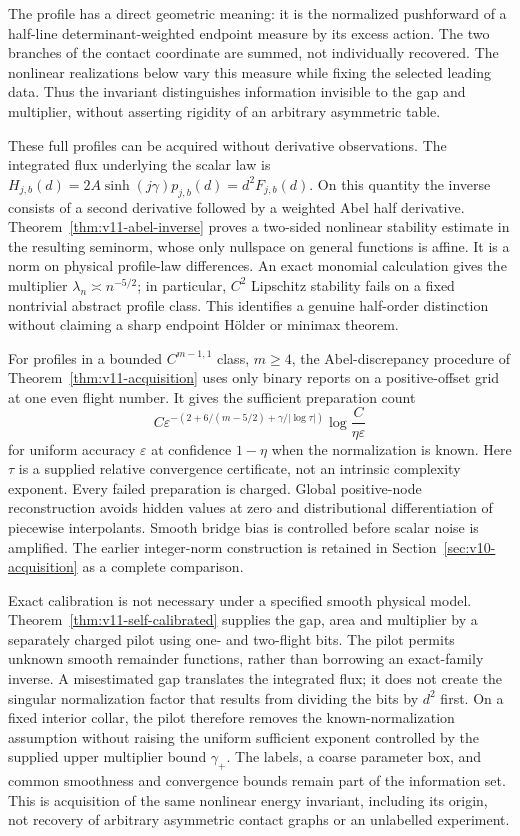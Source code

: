 The profile has a direct geometric meaning: it is the normalized
pushforward of a half-line determinant-weighted endpoint measure by
its excess action. The two branches of the contact coordinate are
summed, not individually recovered. The nonlinear realizations below
vary this measure while fixing the selected leading data. Thus the
invariant distinguishes information invisible to the gap and multiplier,
without asserting rigidity of an arbitrary asymmetric table.

These full profiles can be acquired without derivative observations.
The integrated flux underlying the scalar law is
$H_{j,b}(d)=2A\sinh(j\gamma)p_{j,b}(d)=d^2F_{j,b}(d)$.
On this quantity the inverse consists of a second derivative followed
by a weighted Abel half derivative. Theorem~\ref{thm:v11-abel-inverse}
proves a two-sided nonlinear stability estimate in the resulting
seminorm, whose only nullspace on general functions is affine.
It is a norm on physical profile-law differences. An exact monomial
calculation gives the multiplier $\lambda_n\asymp n^{-5/2}$;
in particular, $C^2$ Lipschitz stability fails on a fixed nontrivial
abstract profile class. This identifies a genuine half-order distinction
without claiming a sharp endpoint H\"older or minimax theorem.

For profiles in a bounded $C^{m-1,1}$ class, $m\ge4$, the
Abel-discrepancy procedure of Theorem~\ref{thm:v11-acquisition} uses
only binary reports on a positive-offset grid at one even flight number.
It gives the sufficient preparation count
\[
 C\varepsilon^{-\left(2+6/(m-5/2)+\gamma/|\log\tau|\right)}
                         \log\frac{C}{\eta\varepsilon}
\]
for uniform accuracy $\varepsilon$ at confidence $1-\eta$ when
the normalization is known. Here $\tau$ is a supplied relative
convergence certificate, not an intrinsic complexity exponent.
Every failed preparation is charged. Global positive-node reconstruction
avoids hidden values at zero and distributional differentiation of
piecewise interpolants. Smooth bridge bias is controlled before scalar
noise is amplified. The earlier integer-norm construction is retained
in Section~\ref{sec:v10-acquisition} as a complete comparison.

Exact calibration is not necessary under a specified smooth physical
model. Theorem~\ref{thm:v11-self-calibrated} supplies the gap, area
and multiplier by a separately charged pilot using one- and two-flight
bits. The pilot permits unknown smooth remainder functions, rather than
borrowing an exact-family inverse. A misestimated gap translates the
integrated flux; it does not create the singular normalization factor
that results from dividing the bits by $d^2$ first. On a fixed interior
collar, the pilot therefore removes the known-normalization assumption
without raising the uniform sufficient exponent controlled by the
supplied upper multiplier bound $\gamma_+$. The labels, a coarse
parameter box, and common smoothness and convergence bounds remain part
of the information set. This is acquisition of the same nonlinear
energy invariant, including its origin, not recovery of arbitrary
asymmetric contact graphs or an unlabelled experiment.

